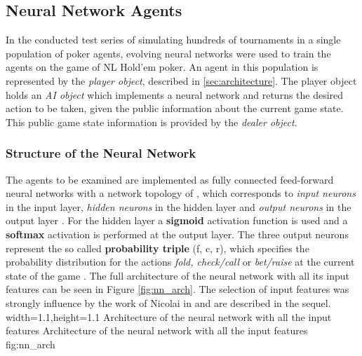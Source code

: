 \subsection{Neural Network Agents}
\label{subsec:nnagent}
In the conducted test series of simulating hundreds of tournaments in a single population of poker agents, evolving neural networks were used to train the agents on the game of NL Hold'em poker. An agent in this population is represented by the \textit{player object}, described in \ref{sec:architecture}. The player object holds an \textit{AI object} which implements a neural network and returns the desired action to be taken, given the public information about the current game state. This public game state information is provided by the \textit{dealer object}.
\subsubsection{Structure of the Neural Network}
The agents to be examined are implemented as fully connected feed-forward neural networks with a network topology of , which corresponds to  \textit{input neurons} in the input layer,  \textit{hidden neurons} in the hidden layer and  \textit{output neurons} in the output layer \cite{ENN_garrett}. For the hidden layer a \textbf{sigmoid} activation function is used and a \textbf{softmax} activation is performed at the output layer. The three output neurons represent the so called \textbf{probability triple} (f, c, r), which specifies the probability distribution for the actions \textit{fold, check/call} or \textit{bet/raise} at the current state of the game \cite{review}. The full architecture of the neural network with all its input features can be seen in Figure \ref{fig:nn_arch}. The selection of input features was strongly influence by the work of Nicolai in \cite{evolutionary_methods} and are described in the sequel. 
  {width=1.1\textwidth,height=1.1\textheight}%
  {Architecture of the neural network with all the input features}%
  {Architecture of the neural network with all the input features}%
  {fig:nn_arch}%
